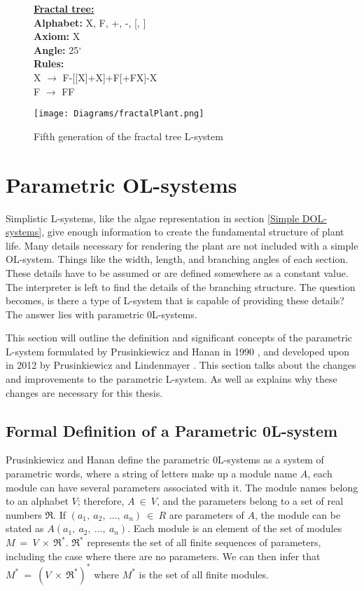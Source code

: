 \begin{figure}[htbp]
	\raggedright
	\textbf{\underline{Fractal tree:}} \\
	\textbf{Alphabet:} X, F, +, -, [, ] \\
	\textbf{Axiom:} X \\
	\textbf{Angle:} 25$^\circ$ \\
	\textbf{Rules:} \\
	X $\rightarrow$ F-[[X]+X]+F[+FX]-X\\
	F $\rightarrow$ FF \\
	{\centering
		\vspace{7px}
		\texttt{[image: Diagrams/fractalPlant.png]}
		\caption{Fifth generation of the fractal tree L-system} \label{fractal plant}
	}
\end{figure}
\FloatBarrier

\section{Parametric OL-systems} \label{parametric}

Simplistic L-systems, like the algae representation in section \ref{Simple DOL-systems}, give enough information to create the fundamental structure of plant life. Many details necessary for rendering the plant are not included with a simple OL-system. Things like the width, length, and branching angles of each section. These details have to be assumed or are defined somewhere as a constant value. The interpreter is left to find the details of the branching structure. The question becomes, is there a type of L-system that is capable of providing these details? The answer lies with parametric 0L-systems.

This section will outline the definition and significant concepts of the parametric L-system formulated by Prusinkiewicz and Hanan in 1990 \cite{prusinkiewicz1990visualization}, and developed upon in 2012 by Prusinkiewicz and Lindenmayer \cite{prusinkiewicz2012algorithmic}. This section talks about the changes and improvements to the parametric L-system. As well as explains why these changes are necessary for this thesis.

\subsection{Formal Definition of a Parametric 0L-system} \label{definition of a parametric 0L-system section}

Prusinkiewicz and Hanan define the parametric 0L-systems as a system of parametric words, where a string of letters make up a module name $A$, each module can have several parameters associated with it. The module names belong to an alphabet $V$; therefore, $A~ \in~ V$, and the parameters belong to a set of real numbers $\Re$. If $(a_1,~ a_2,~ ...,~ a_n)~ \in~ R$ are parameters of $A$, the module can be stated as $A(a_1,~ a_2,~ ...,~ a_n)$. Each module is an element of the set of modules $M~ =~ V~ \times~ \Re^*$. $\Re^*$ represents the set of all finite sequences of parameters, including the case where there are no parameters. We can then infer that $M^*~ =~ (V~ \times~ \Re^*)^*$ where $M^*$ is the set of all finite modules. 

